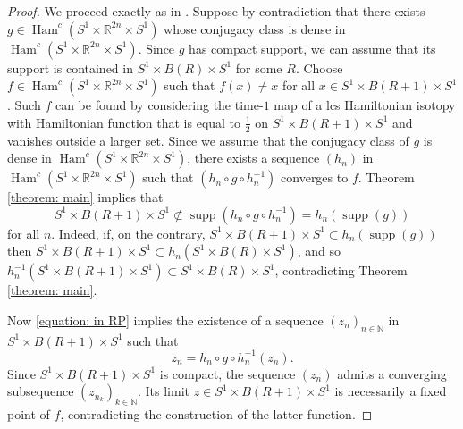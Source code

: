\documentclass{amsart}
\newcommand{\N}{\mathbb{N}}
\newcommand{\R}{\mathbb{R}}
\DeclareMathOperator{\Ham}{Ham}
\DeclareMathOperator{\LCS}{LCS}
\DeclareMathOperator{\supp}{supp}
\DeclareMathOperator{\Symp}{Symp}
\newtheorem{remark}[thm]{Remark}
\theoremstyle{remark}
\begin{document}
\begin{proof}
We  proceed exactly as in \cite{SS}.
Suppose by contradiction that there exists
$g \in \Ham^c (S^1 \times \R^{2n} \times S^1)$
whose conjugacy class is dense
in $\Ham^c (S^1 \times \R^{2n} \times S^1)$.
Since $g$ has compact support,
we can assume that its support is contained in
$S^1 \times B(R) \times S^1$
for some $R$.
Choose $f \in \Ham^c (S^1 \times \R^{2n} \times S^1)$
such that $f(x) \neq x$ for all $x \in S^1 \times B(R+1) \times S^1$.
Such $f$ can be found
by considering the time-$1$ map of a lcs Hamiltonian isotopy
with Hamiltonian function that is equal to $\frac{1}{2}$
on $S^1 \times B(R+1) \times S^1$
and vanishes outside a larger set.
Since we assume that the conjugacy class of $g$
is dense in $\Ham^c (S^1 \times \R^{2n} \times S^1)$,
there exists a sequence $(h_n)$
in $\Ham^c( S^1 \times \R^{2n} \times S^1)$
such that $(h_n \circ g \circ h_n^{-1})$ converges to $f$.
Theorem \ref{theorem: main} implies that
\begin{equation}\label{equation: in RP}
S^1 \times B(R+1) \times S^1 \not\subset \supp(h_n \circ g \circ h_n^{-1}) = h_n(\supp(g))
\end{equation}
for all $n$.
Indeed,
if, on the contrary, $S^1 \times B(R+1) \times S^1 \subset h_n (\supp(g))$
then $S^1 \times B(R+1) \times S^1
\subset h_n (S^1 \times B(R) \times S^1)$,
and so $h_n^{-1}(S^1 \times B(R+1) \times S^1) \subset S^1 \times B(R) \times S^1$, contradicting Theorem \ref{theorem: main}.

Now \ref{equation: in RP} implies the existence of a sequence $(z_n)_{n \in \N}$ in $S^1 \times B(R+1) \times S^1$ such that $$z_n = h_n \circ g \circ h_n^{-1} (z_n).$$ 
Since $S^1 \times B(R+1) \times S^1$ is compact, the sequence $(z_n)$ admits a converging subsequence $(z_{n_k})_{k \in \N}$. Its limit $z \in S^1 \times B(R+1) \times S^1$ is necessarily a fixed point of $f$, contradicting the construction of the latter function. 

\end{proof}

\end{document}
